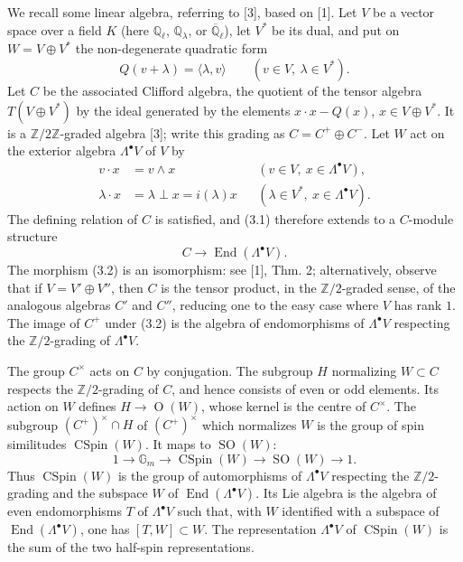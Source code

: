 \documentclass[11pt]{article}
\newcommand{\Q}{\mathbb Q}
\newcommand{\Z}{\mathbb Z}
\newcommand{\Gm}{\mathbb G_m}
\newcommand{\End}{\operatorname{End}}
\newcommand{\SO}{\operatorname{SO}}
\newcommand{\OO}{\operatorname{O}}
\newcommand{\CSpin}{\operatorname{CSpin}}
\theoremstyle{deligne}
\newcommand{\heading}[1]{\vspace{0.7em}\noindent{\bfseries #1}\quad}
\begin{document}
\heading{3.}
We recall some linear algebra, referring to [3], based on [1]. Let $V$ be a vector space over a field $K$ (here $\Q_\ell$, $\Q_\lambda$, or $\overline{\Q}_\ell$), let $V^*$ be its dual, and put on $W=V\oplus V^*$ the non-degenerate quadratic form
\[
Q(v+\lambda)=\langle\lambda,v\rangle\qquad (v\in V,\ \lambda\in V^*).
\]
Let $C$ be the associated Clifford algebra, the quotient of the tensor algebra $T(V\oplus V^*)$ by the ideal generated by the elements $x\cdot x-Q(x)$, $x\in V\oplus V^*$. It is a $\Z/2\Z$-graded algebra [3]; write this grading as $C=C^+\oplus C^-$. Let $W$ act on the exterior algebra $\Lambda^\bullet V$ of $V$ by
\begin{equation}\tag{3.1}
\begin{aligned}
v\cdot x&=v\wedge x &&(v\in V,
\ x\in\Lambda^\bullet V),\\
\lambda\cdot x&=\lambda\perp x=i(\lambda)x &&(\lambda\in V^*,\ x\in\Lambda^\bullet V).
\end{aligned}
\end{equation}
The defining relation of $C$ is satisfied, and (3.1) therefore extends to a $C$-module structure
\begin{equation}\tag{3.2}
C\longrightarrow \End(\Lambda^\bullet V).
\end{equation}
The morphism (3.2) is an isomorphism: see [1], Thm. 2; alternatively, observe that if $V=V'\oplus V''$, then $C$ is the tensor product, in the $\Z/2$-graded sense, of the analogous algebras $C'$ and $C''$, reducing one to the easy case where $V$ has rank $1$. The image of $C^+$ under (3.2) is the algebra of endomorphisms of $\Lambda^\bullet V$ respecting the $\Z/2$-grading of $\Lambda^\bullet V$.

The group $C^\times$ acts on $C$ by conjugation. The subgroup $H$ normalizing $W\subset C$ respects the $\Z/2$-grading of $C$, and hence consists of even or odd elements. Its action on $W$ defines $H\to\OO(W)$, whose kernel is the centre of $C^\times$. The subgroup $(C^+)^\times\cap H$ of $(C^+)^\times$ which normalizes $W$ is the group of spin similitudes $\CSpin(W)$. It maps to $\SO(W)$:
\[
1\longrightarrow\Gm\longrightarrow\CSpin(W)\longrightarrow\SO(W)\longrightarrow1.
\]
Thus $\CSpin(W)$ is the group of automorphisms of $\Lambda^\bullet V$ respecting the $\Z/2$-grading and the subspace $W$ of $\End(\Lambda^\bullet V)$. Its Lie algebra is the algebra of even endomorphisms $T$ of $\Lambda^\bullet V$ such that, with $W$ identified with a subspace of $\End(\Lambda^\bullet V)$, one has $[T,W]\subset W$. The representation $\Lambda^\bullet V$ of $\CSpin(W)$ is the sum of the two half-spin representations.
\end{document}
